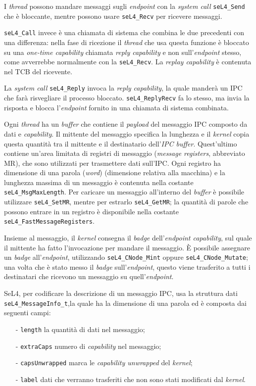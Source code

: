 I \textit{thread} possono mandare messaggi sugli \textit{endpoint} con la \textit{system call} \texttt{seL4\_Send} che è bloccante, mentre possono usare \texttt{seL4\_Recv} per ricevere messaggi.

\texttt{seL4\_Call} invece è una chiamata di sistema che combina le due precedenti con una differenza: nella fase di ricezione il \textit{thread} che usa questa funzione è bloccato su una \textit{one-time capability} chiamata \textit{reply capability} e non sull'\textit{endpoint} stesso, come avverrebbe normalmente con la \texttt{seL4\_Recv}. La \textit{replay capability} è contenuta nel TCB del ricevente.

La \textit{system call} \texttt{seL4\_Reply} invoca la \textit{reply capability}, la quale manderà un IPC che farà risvegliare il processo bloccato. \texttt{seL4\_ReplyRecv} fa lo stesso, ma invia la risposta e blocca l'\textit{endpoint} fornito in una chiamata di sistema combinata.

Ogni \textit{thread} ha un \textit{buffer} che contiene il \textit{payload} del messaggio IPC composto da dati e \textit{capability}. Il mittente del messaggio specifica la lunghezza e il \textit{kernel} copia questa quantità tra il mittente e il destinatario dell'\textit{IPC buffer}. Quest'ultimo contiene un'area limitata di registri di messaggio (\textit{message registers}, abbreviato MR), che sono utilizzati per trasmettere dati sull'IPC. Ogni registro ha dimensione di una parola (\textit{word}) (dimensione relativa alla macchina) e la lunghezza massima di un messaggio è contenuta nella costante \texttt{seL4\_MsgMaxLength}. Per caricare un messaggio all'interno del \textit{buffer} è possibile utilizzare \texttt{seL4\_SetMR}, mentre per estrarlo \texttt{seL4\_GetMR}; la quantità di parole che possono entrare in un registro è disponibile nella costante \texttt{seL4\_FastMessageRegisters}.

Insieme al messaggio, il \textit{kernel} consegna il \textit{badge} dell'\textit{endpoint capability}, sul quale il mittente ha fatto l'invocazione per mandare il messaggio. È possibile assegnare un \textit{badge} all'\textit{endpoint}, utilizzando \texttt{seL4\_CNode\_Mint} oppure \texttt{seL4\_CNode\_Mutate}; una volta che è stato messo il \textit{badge} sull'\textit{endpoint}, questo viene trasferito a tutti i destinatari che ricevono un messaggio su quell'\textit{endpoint}.

SeL4, per codificare la descrizione di un messaggio IPC, usa la struttura dati \texttt{seL4\_MessageInfo\_t},la quale ha la dimensione di una parola ed è composta dai seguenti campi: 
\begin{itemize}
	\item[-] \texttt{length} la quantità di dati nel messaggio;
	\item[-] \texttt{extraCaps} numero di \textit{capability} nel messaggio;
	\item[-] \texttt{capsUnwrapped} marca le \textit{capability unwrapped} del \textit{kernel};
	\item[-] \texttt{label} dati che verranno trasferiti che non sono stati modificati dal \textit{kernel}.
\end{itemize}

